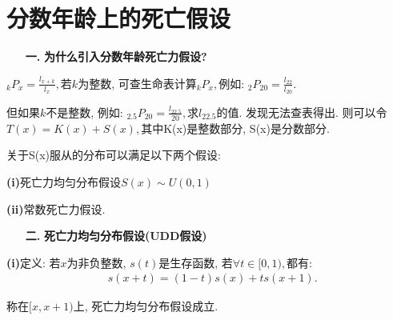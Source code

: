 \documentclass[a4paper,10pt]{ctexbook}
\newcommand{\hei}{\CJKfamily{hei}}      %
\begin{document}
\section{分数年龄上的死亡假设}
\begin{itemize}
    \item[{\bf\hei 一.}]{\bf\hei 为什么引入分数年龄死亡力假设?}
\end{itemize}

$_{k}P_{x}=\frac{l_{x+k}}{l_{x}},$若$k$为整数, 可查生命表计算$_{k}P_{x},$例如: $_{2}P_{20}=\frac{l_{22}}{l_{20}}.$

但如果$k$不是整数, 例如: $_{2.5}P_{20}=\frac{l_{22.5}}{20},$求$l_{22.5}$的值. 发现无法查表得出.
则可以令$T(x)=K(x)+S(x),$其中K(x)是整数部分, S(x)是分数部分.

关于S(x)服从的分布可以满足以下两个假设:

{\rm\bf(i)}死亡力均匀分布假设$S(x)\sim U(0,1)$

{\rm\bf(ii)}常数死亡力假设.

\begin{itemize}
    \item[{\bf\hei 二.}]{\bf\hei 死亡力均匀分布假设(UDD假设)}
\end{itemize}

{\rm\bf(i)}定义: 若$x$为非负整数, $s(t)$是生存函数, 若$\forall t\in [0,1),$都有:
\begin{align}\label{tul}
     & s(x+t)=(1-t)s(x)+ts(x+1).
\end{align}

称在$[x,x+1)$上, 死亡力均匀分布假设成立.
\end{document}
